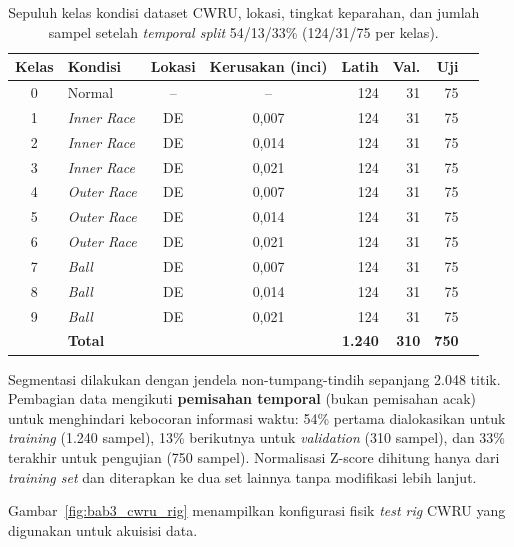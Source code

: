 \begin{table}[ht]
\centering
\caption{Sepuluh kelas kondisi dataset CWRU, lokasi, tingkat keparahan,
         dan jumlah sampel setelah \emph{temporal split}
         {\color{blue}54/13/33\% (124/31/75 per kelas).}}%
\label{tab:bab3_cwru_kelas}
\small
\begin{tabular}{@{}clccrrrr@{}}
\toprule
\textbf{Kelas} & \textbf{Kondisi} & \textbf{Lokasi} &
\textbf{Kerusakan (inci)} & \textbf{Latih} & {\color{blue}\textbf{Val.}} & \textbf{Uji} \\
\midrule
0 & Normal            & --  & --     & 124 & {\color{blue}31} & 75 \\
1 & \emph{Inner Race} & DE & 0,007 & 124 & {\color{blue}31} & 75 \\
2 & \emph{Inner Race} & DE & 0,014 & 124 & {\color{blue}31} & 75 \\
3 & \emph{Inner Race} & DE & 0,021 & 124 & {\color{blue}31} & 75 \\
4 & \emph{Outer Race} & DE & 0,007 & 124 & {\color{blue}31} & 75 \\
5 & \emph{Outer Race} & DE & 0,014 & 124 & {\color{blue}31} & 75 \\
6 & \emph{Outer Race} & DE & 0,021 & 124 & {\color{blue}31} & 75 \\
7 & \emph{Ball}       & DE & 0,007 & 124 & {\color{blue}31} & 75 \\
8 & \emph{Ball}       & DE & 0,014 & 124 & {\color{blue}31} & 75 \\
9 & \emph{Ball}       & DE & 0,021 & 124 & {\color{blue}31} & 75 \\
\midrule
  & \textbf{Total}    &    &       & \textbf{1.240} & {\color{blue}\textbf{310}} & \textbf{750} \\
\bottomrule
\end{tabular}
\end{table}

Segmentasi dilakukan dengan jendela non-tumpang-tindih sepanjang 2.048 titik.
Pembagian data mengikuti \textbf{pemisahan temporal} (bukan pemisahan acak)
untuk menghindari kebocoran informasi waktu: 54\% pertama dialokasikan untuk
\emph{training} (1.240 sampel), 13\% berikutnya untuk \emph{validation}
(310 sampel), dan 33\% terakhir untuk pengujian (750 sampel). Normalisasi
Z-score dihitung hanya dari \emph{training set} dan diterapkan ke dua set
lainnya tanpa modifikasi lebih lanjut.

Gambar~\ref{fig:bab3_cwru_rig} menampilkan konfigurasi fisik \emph{test rig}
CWRU yang digunakan untuk akuisisi data.

